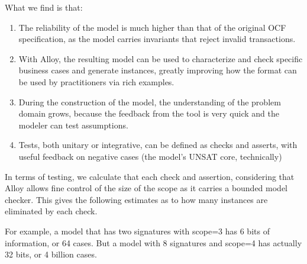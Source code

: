 What we find is that:

\begin{enumerate}
	\item The reliability of the model is much higher than that of the original OCF specification, as the model carries invariants that reject invalid transactions.
	\item With Alloy, the resulting model can be used to characterize and check specific business cases and generate instances, greatly improving how the format can be used by practitioners via rich examples.
	\item During the construction of the model, the understanding of the problem domain grows, because the feedback from the tool is very quick and the modeler can test assumptions.
	\item Tests, both unitary or integrative, can be defined as checks and asserts, with useful feedback on negative cases (the model's UNSAT core, technically)
\end{enumerate}

In terms of testing, we calculate that each check and assertion, considering that Alloy allows fine control of the size of the scope as it carries a bounded model checker. This gives the following estimates as to how many instances are eliminated by each check.

For example, a model that has two signatures with scope=3 has 6 bits of information, or 64 cases. But a model with 8 signatures and scope=4 has actually 32 bits, or 4 billion cases.

